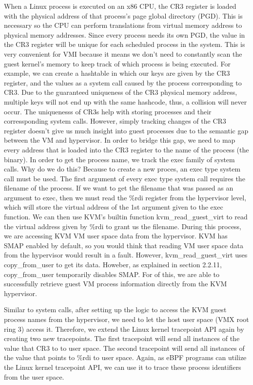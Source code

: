 \documentclass{report}
\begin{document}
\begin{spacing}{1.5}
{\large
When a Linux process is executed on an x86 CPU, the CR3 register is loaded with the physical address of that process's page global directory (PGD). This is necessary so the CPU can perform translations from virtual memory address to physical memory addresses. Since every process needs its own PGD, the value in the CR3 register will be unique for each scheduled process in the system. This is very convenient for VMI because it means we don't need to constantly scan the guest kernel's memory to keep track of which process is being executed. For example, we can create a hashtable in which our keys are given by the CR3 register, and the values as a system call caused by the process corresponding to CR3. Due to the guaranteed uniqueness of the CR3 physical memory address, multiple keys will not end up with the same hashcode, thus, a collision will never occur. The uniquenesss of CR3s help with storing processes and their corressponding system calls. However, simply tracking changes of the CR3 register doesn't give us much insight into guest processes due to the semantic gap between the VM and hypervisor. In order to bridge this gap, we need to map every address that is loaded into the CR3 register to the name of the process (the binary). In order to get the process name, we track the exec family of system calls. Why do we do this? Because to create a new proces, an exec type system call must be used. The first argument of every exec type system call requires the filename of the process. If we want to get the filename that was passed as an argument to exec, then we must read the \%rdi register from the hypervisor level, which will store the virtual address of the 1st argument given to the exec function. We can then use KVM's builtin function kvm\_read\_guest\_virt to read the virtual address given by \%rdi to grant us the filename. During this process, we are accessing KVM VM user space data from the hypervisor. KVM has SMAP enabled by default, so you would think that reading VM user space data from the hypervisor would result in a fault. However, kvm\_read\_guest\_virt uses copy\_from\_user to get its data. Howeber, as explained in section 2.2.11, copy\_from\_user temporarily disables SMAP. For of this, we are able to successfully retrieve guest VM process information directly from the KVM hypervisor.
\newline
}


{\large
Similar to system calls, after setting up the logic to access the KVM guest process names from the hypervisor, we need to let the host user space (VMX root ring 3) access it. Therefore, we extend the Linux kernel tracepoint API again by creating two new tracepoints. The first tracepoint will send all instances of the value that CR3 to to user space. The second tracepoint will send all instances of the value that points to \%rdi to user space. Again, as eBPF programs can utilize the Linux kernel tracepoint API, we can use it to trace these process identifiers from the user space.  
\newline
}



\end{spacing}
\end{document}

